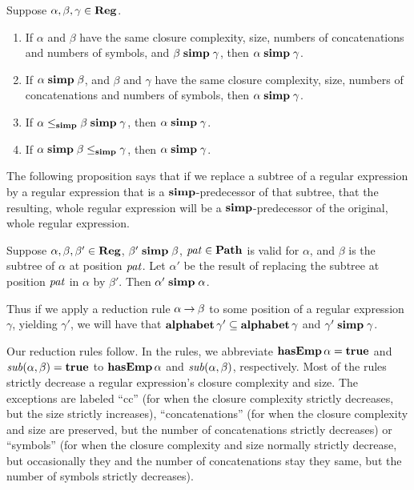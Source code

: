 \begin{proposition}
\label{SimpTransLEQSimp}
Suppose $\alpha, \beta, \gamma\in\mathbf{Reg}$.

\begin{enumerate}[\quad(1)]
\item If $\alpha$ and $\beta$ have the same closure complexity, size,
  numbers of concatenations and numbers of symbols, and $\beta\mathrel{\mathbf{simp}}\gamma$,
  then $\alpha\mathrel{\mathbf{simp}}\gamma$.

\item If $\alpha\mathrel{\mathbf{simp}}\beta$, and $\beta$ and $\gamma$ have the same
  closure complexity, size, numbers of concatenations and numbers of
  symbols, then $\alpha\mathrel{\mathbf{simp}}\gamma$.

\item If $\alpha\mathrel{\leq_{\mathbf{simp}}}\beta\mathrel{\mathbf{simp}}\gamma$, then $\alpha\mathrel{\mathbf{simp}}\gamma$.
  
\item If $\alpha\mathrel{\mathbf{simp}}\beta\mathrel{\leq_{\mathbf{simp}}}\gamma$, then $\alpha\mathrel{\mathbf{simp}}\gamma$.
\end{enumerate}
\end{proposition}

The following proposition says that if we replace a subtree of a
regular expression by a regular expression that is a
$\mathrel{\mathbf{simp}}$-predecessor of that subtree, that the resulting, whole regular
expression will be a $\mathrel{\mathbf{simp}}$-predecessor of the original, whole
regular expression.

\begin{proposition}
\label{RegSimpSubtreeSubstitute}

Suppose $\alpha,\beta,\beta'\in\mathbf{Reg}$, $\beta'\mathrel{\mathbf{simp}}\beta$,
${\it pat}\in\mathbf{Path}$ is valid for $\alpha$, and $\beta$ is
the subtree of $\alpha$ at position ${\it pat}$.
Let $\alpha'$ be the result of replacing the subtree at
position ${\it pat}$ in $\alpha$ by $\beta'$. Then $\alpha'\mathrel{\mathbf{simp}}\alpha$.
\end{proposition}

Thus if we apply a reduction rule $\alpha\mathbin{\to}\beta$ to some position
of a regular expression $\gamma$, yielding $\gamma'$, we will have
that $\mathbf{alphabet}\,\gamma'\subseteq\mathbf{alphabet}\,\gamma$ and $\gamma'\mathrel{\mathbf{simp}}\gamma$.

Our reduction rules follow.  In the rules, we abbreviate
$\mathbf{hasEmp}\,\alpha=\mathbf{true}$ and ${\it sub}(\alpha,\beta)=\mathbf{true}$ to
$\mathbf{hasEmp}\,\alpha$ and ${\it sub}(\alpha,\beta)$, respectively.  Most of
the rules strictly decrease a regular expression's closure complexity
and size.  The exceptions are labeled ``cc'' (for when the closure
complexity strictly decreases, but the size strictly increases),
``concatenations'' (for when the closure complexity and size are
preserved, but the number of concatenations strictly decreases) or
``symbols'' (for when the closure complexity and size normally strictly
decrease, but occasionally they and the number of concatenations stay
they same, but the number of symbols strictly decreases).

